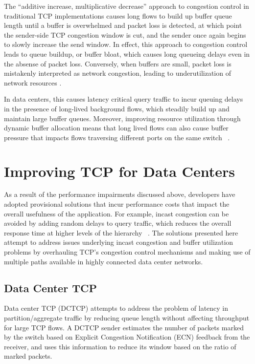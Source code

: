 The ``additive increase, multiplicative decrease'' approach to congestion control in traditional TCP implementations causes long flows to build up buffer queue length until a buffer is overwhelmed and packet loss is detected, at which point the sender-side TCP congestion window is cut, and the sender once again begins to slowly increase the send window. In effect, this approach to congestion control leads to queue buildup, or buffer bloat, which causes long queueing delays even in the absense of packet loss. Conversely, when buffers are small, packet loss is mistakenly interpreted as network congestion, leading to underutilization of network resources \cite{cardwell_bbr:_2016}.

In data centers, this causes latency critical query traffic to incur queuing delays in the presence of long-lived background flows, which steadily build up and maintain large buffer queues. Moreover, improving resource utilization through dynamic buffer allocation means that long lived flows can also cause buffer pressure that impacts flows traversing different ports on the same switch ~\cite{alizadeh_data_2010}.

\section{Improving TCP for Data Centers}

As a result of the performance impairments discussed above, developers have adopted provisional solutions that incur performance costs that impact the overall usefulness of the application. For example, incast congestion can be avoided by adding random delays to query traffic, which reduces the overall response time at higher levels of the hierarchy ~\cite{alizadeh_data_2010, floyd_synchronization_1994}. The solutions presented here attempt to address issues underlying incast congestion and buffer utilization problems by overhauling TCP's congestion control mechanisms and making use of multiple paths available in highly connected data center networks.

\subsection{Data Center TCP}

Data center TCP (DCTCP) attempts to address the problem of latency in partition/aggregate traffic by reducing queue length without affecting throughput for large TCP flows. A DCTCP sender estimates the number of packets marked by the switch based on Explicit Congestion Notification (ECN) feedback from the receiver, and uses this information to reduce its window based on the ratio of marked packets. 

